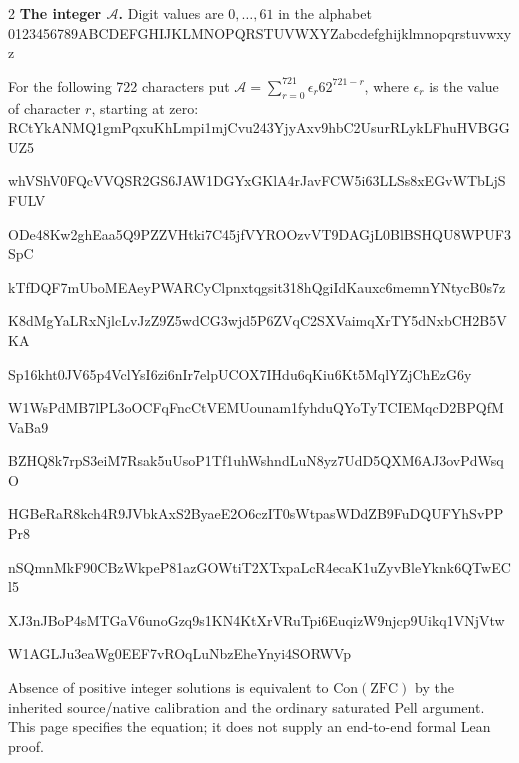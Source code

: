 \documentclass[10pt]{article}
\let\bigsum\sum
\renewcommand{\sum}{\bigsum\nolimits}
\begin{document}
\begin{multicols}{2}
\textbf{The integer $\mathcal A$.} Digit values are $0,\ldots,61$ in the alphabet
\begingroup\fontsize{8}{8.8}\selectfont\ttfamily
0123456789ABCDEFGHIJKLMNOPQRSTUVWXYZabcdefghijklmnopqrstuvwxyz\par
\endgroup
For the following 722 characters put
$\mathcal A=\sum_{r=0}^{721}\epsilon_r62^{721-r}$, where $\epsilon_r$
is the value of character $r$, starting at zero:
\begingroup
\fontsize{8}{8.8}\selectfont\ttfamily
RCtYkANMQ1gmPqxuKhLmpi1mjCvu243YjyAxv9hbC2UsurRLykLFhuHVBGGUZ5\par
whVShV0FQcVVQSR2GS6JAW1DGYxGKlA4rJavFCW5i63LLSs8xEGvWTbLjSFULV\par
ODe48Kw2ghEaa5Q9PZZVHtki7C45jfVYROOzvVT9DAGjL0BlBSHQU8WPUF3SpC\par
kTfDQF7mUboMEAeyPWARCyClpnxtqgsit318hQgiIdKauxc6memnYNtycB0s7z\par
K8dMgYaLRxNjlcLvJzZ9Z5wdCG3wjd5P6ZVqC2SXVaimqXrTY5dNxbCH2B5VKA\par
Sp16kht0JV65p4VclYsI6zi6nIr7elpUCOX7IHdu6qKiu6Kt5MqlYZjChEzG6y\par
W1WsPdMB7lPL3oOCFqFncCtVEMUounam1fyhduQYoTyTCIEMqcD2BPQfMVaBa9\par
BZHQ8k7rpS3eiM7Rsak5uUsoP1Tf1uhWshndLuN8yz7UdD5QXM6AJ3ovPdWsqO\par
HGBeRaR8kch4R9JVbkAxS2ByaeE2O6czIT0sWtpasWDdZB9FuDQUFYhSvPPPr8\par
nSQmnMkF90CBzWkpeP81azGOWtiT2XTxpaLcR4ecaK1uZyvBleYknk6QTwECl5\par
XJ3nJBoP4sMTGaV6unoGzq9s1KN4KtXrVRuTpi6EuqizW9njcp9Uikq1VNjVtw\par
W1AGLJu3eaWg0EEF7vROqLuNbzEheYnyi4SORWVp\par
\endgroup
\smallskip
\normalfont\fontsize{8}{8.8}\selectfont
Absence of positive integer solutions is equivalent to
$\mathrm{Con}(\mathrm{ZFC})$ by the inherited source/native calibration and
the ordinary saturated Pell argument. This page specifies the equation;
it does not supply an end-to-end formal Lean proof.
\end{multicols}
\end{document}

